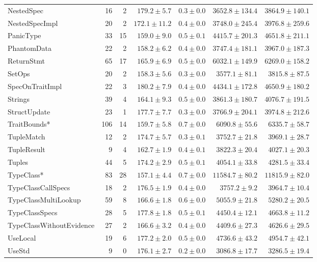 \begin{table}
\begin{tabular}{lrrrrrr}
NestedSpec               &   16 &    2 &      $179.2\pm5.7$ &  $0.3\pm0.0$ &   $3652.8\pm134.4$ &   $3864.9\pm140.1$ \\
NestedSpecImpl           &   20 &    2 &     $172.1\pm11.2$ &  $0.4\pm0.0$ &   $3748.0\pm245.4$ &   $3976.8\pm259.6$ \\
PanicType                &   33 &   15 &      $159.0\pm9.0$ &  $0.5\pm0.1$ &   $4415.7\pm201.3$ &   $4651.8\pm211.1$ \\
PhantomData              &   22 &    2 &      $158.2\pm6.2$ &  $0.4\pm0.0$ &   $3747.4\pm181.1$ &   $3967.0\pm187.3$ \\
ReturnStmt               &   65 &   17 &      $165.9\pm6.9$ &  $0.5\pm0.0$ &   $6032.1\pm149.9$ &   $6269.0\pm158.2$ \\
SetOps                   &   20 &    2 &      $158.3\pm5.6$ &  $0.3\pm0.0$ &    $3577.1\pm81.1$ &    $3815.8\pm87.5$ \\
SpecOnTraitImpl          &   22 &    3 &      $180.2\pm7.9$ &  $0.4\pm0.0$ &   $4434.1\pm172.8$ &   $4650.9\pm180.2$ \\
Strings                  &   39 &    4 &      $164.1\pm9.3$ &  $0.5\pm0.0$ &   $3861.3\pm180.7$ &   $4076.7\pm191.5$ \\
StructUpdate             &   23 &    1 &      $177.7\pm7.7$ &  $0.3\pm0.0$ &   $3766.9\pm204.1$ &   $3974.8\pm212.6$ \\
TraitBounds*             &  106 &   14 &      $159.7\pm5.8$ &  $0.7\pm0.0$ &    $6090.8\pm55.6$ &    $6335.7\pm58.7$ \\
TupleMatch               &   12 &    2 &      $174.7\pm5.7$ &  $0.3\pm0.1$ &    $3752.7\pm21.8$ &    $3969.1\pm28.7$ \\
TupleResult              &    9 &    4 &      $162.7\pm1.9$ &  $0.4\pm0.1$ &    $3822.3\pm20.4$ &    $4027.1\pm20.3$ \\
Tuples                   &   44 &    5 &      $174.2\pm2.9$ &  $0.5\pm0.1$ &    $4054.1\pm33.8$ &    $4281.5\pm33.4$ \\
TypeClass*               &   83 &   28 &      $157.1\pm4.4$ &  $0.7\pm0.0$ &   $11584.7\pm80.2$ &   $11815.9\pm82.0$ \\
TypeClassCallSpecs       &   18 &    2 &      $176.5\pm1.9$ &  $0.4\pm0.0$ &     $3757.2\pm9.2$ &    $3964.7\pm10.4$ \\
TypeClassMultiLookup     &   59 &    8 &      $166.6\pm1.8$ &  $0.6\pm0.0$ &    $5055.9\pm21.8$ &    $5280.2\pm20.5$ \\
TypeClassSpecs           &   28 &    5 &      $177.8\pm1.8$ &  $0.5\pm0.1$ &    $4450.4\pm12.1$ &    $4663.8\pm11.2$ \\
TypeClassWithoutEvidence &   27 &    2 &      $166.6\pm3.2$ &  $0.4\pm0.0$ &    $4409.6\pm27.3$ &    $4626.6\pm29.5$ \\
UseLocal                 &   19 &    6 &      $177.2\pm2.0$ &  $0.5\pm0.0$ &    $4736.6\pm43.2$ &    $4954.7\pm42.1$ \\
UseStd                   &    9 &    0 &      $176.1\pm2.7$ &  $0.2\pm0.0$ &    $3086.8\pm17.7$ &    $3286.5\pm19.4$ \\
\bottomrule
\end{tabular}
\end{table}
